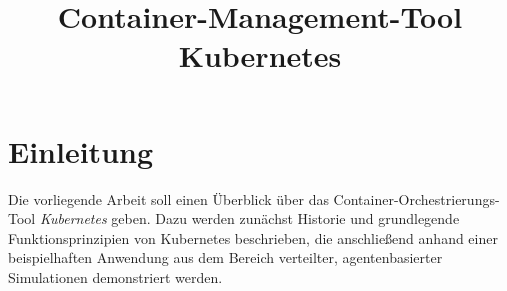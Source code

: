 \documentclass[11pt,a4paper]{article}
\title{Container-Management-Tool Kubernetes}
\begin{document}

\tableofcontents
\thispagestyle{empty}
\newpage



\clearpage
{}
\section{Einleitung}
\label{sec:einleitung}
Die vorliegende Arbeit soll einen Überblick über das Container-\linebreak Orchestrierungs-Tool \emph{Kubernetes} geben.
Dazu werden zunächst Historie und grundlegende Funktionsprinzipien von Kubernetes beschrieben, die anschließend
anhand einer beispielhaften Anwendung aus dem Bereich verteilter, agentenbasierter Simulationen demonstriert werden. %
\end{document}
